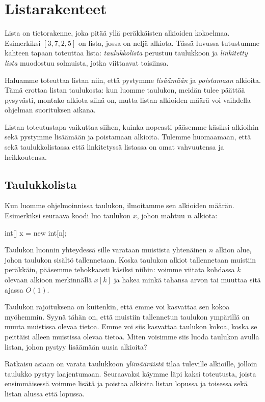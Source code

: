 \chapter{Listarakenteet}

Lista on tietorakenne, joka pitää yllä
peräkkäisten alkioiden kokoelmaa.
Esimerkiksi $[3,7,2,5]$ on lista, jossa on neljä alkiota.
Tässä luvussa tutustumme kahteen tapaan toteuttaa lista:
\emph{taulukkolista} perustuu taulukkoon ja \emph{linkitetty lista}
muodostuu solmuista, jotka viittaavat toisiinsa.

Haluamme toteuttaa listan niin, että pystymme \emph{lisäämään} ja
\emph{poistamaan} alkioita.
Tämä erottaa listan taulukosta:
kun luomme taulukon, meidän tulee päättää pysyvästi,
montako alkiota siinä on,
mutta listan alkioiden määrä voi vaihdella
ohjelman suorituksen aikana.

Listan toteutustapa vaikuttaa siihen, kuinka nopeasti
pääsemme käsiksi alkioihin sekä pystymme lisäämään
ja poistamaan alkioita.
Tulemme huomaamaan, että sekä taulukkolistassa että
linkitetyssä listassa on omat vahvuutensa ja heikkoutensa.

\section{Taulukkolista}

Kun luomme ohjelmoinnissa taulukon,
ilmoitamme sen alkioiden määrän.
Esimerkiksi seuraava koodi luo taulukon
$x$, johon mahtuu $n$ alkiota:

\begin{code}
int[] x = new int[n];
\end{code}

Taulukon luonnin yhteydessä sille varataan muistista
yhtenäinen $n$ alkion alue, johon taulukon sisältö tallennetaan.
Koska taulukon alkiot tallennetaan muistiin peräkkäin,
pääsemme tehokkaasti käsiksi niihin:
voimme viitata kohdassa $k$ olevaan alkioon
merkinnällä $x[k]$ ja hakea minkä tahansa arvon tai
muuttaa sitä ajassa $O(1)$.

Taulukon rajoituksena on kuitenkin, että emme voi kasvattaa
sen kokoa myöhemmin.
Syynä tähän on, että muistiin tallennetun taulukon ympärillä
on muuta muistissa olevaa tietoa.
Emme voi siis kasvattaa taulukon kokoa, koska se peittäisi
alleen muistissa olevaa tietoa.
Miten voisimme siis luoda taulukon avulla listan,
johon pystyy lisäämään uusia alkioita?

Ratkaisu asiaan on varata taulukkoon
\emph{ylimääräistä} tilaa tuleville alkioille,
jolloin taulukko pystyy laajentumaan.
Seuraavaksi käymme läpi kaksi toteutusta,
joista ensimmäisessä voimme lisätä ja poistaa alkioita
listan lopussa ja toisessa sekä listan alussa että lopussa.

